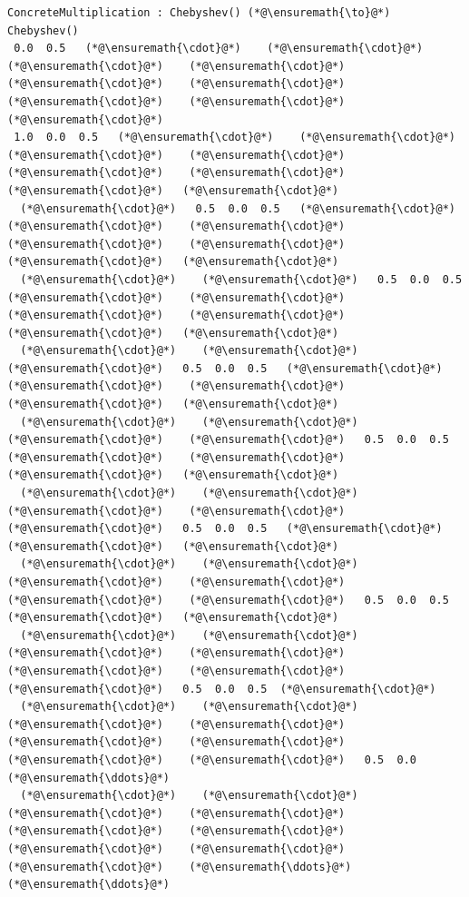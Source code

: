 \documentclass[12pt,a4paper]{article}
\begin{document}
\begin{lstlisting}
ConcreteMultiplication : Chebyshev() (*@\ensuremath{\to}@*) Chebyshev()
 0.0  0.5   (*@\ensuremath{\cdot}@*)    (*@\ensuremath{\cdot}@*)    (*@\ensuremath{\cdot}@*)    (*@\ensuremath{\cdot}@*)    (*@\ensuremath{\cdot}@*)    (*@\ensuremath{\cdot}@*)    (*@\ensuremath{\cdot}@*)    (*@\ensuremath{\cdot}@*)   (*@\ensuremath{\cdot}@*)
 1.0  0.0  0.5   (*@\ensuremath{\cdot}@*)    (*@\ensuremath{\cdot}@*)    (*@\ensuremath{\cdot}@*)    (*@\ensuremath{\cdot}@*)    (*@\ensuremath{\cdot}@*)    (*@\ensuremath{\cdot}@*)    (*@\ensuremath{\cdot}@*)   (*@\ensuremath{\cdot}@*)
  (*@\ensuremath{\cdot}@*)   0.5  0.0  0.5   (*@\ensuremath{\cdot}@*)    (*@\ensuremath{\cdot}@*)    (*@\ensuremath{\cdot}@*)    (*@\ensuremath{\cdot}@*)    (*@\ensuremath{\cdot}@*)    (*@\ensuremath{\cdot}@*)   (*@\ensuremath{\cdot}@*)
  (*@\ensuremath{\cdot}@*)    (*@\ensuremath{\cdot}@*)   0.5  0.0  0.5   (*@\ensuremath{\cdot}@*)    (*@\ensuremath{\cdot}@*)    (*@\ensuremath{\cdot}@*)    (*@\ensuremath{\cdot}@*)    (*@\ensuremath{\cdot}@*)   (*@\ensuremath{\cdot}@*)
  (*@\ensuremath{\cdot}@*)    (*@\ensuremath{\cdot}@*)    (*@\ensuremath{\cdot}@*)   0.5  0.0  0.5   (*@\ensuremath{\cdot}@*)    (*@\ensuremath{\cdot}@*)    (*@\ensuremath{\cdot}@*)    (*@\ensuremath{\cdot}@*)   (*@\ensuremath{\cdot}@*)
  (*@\ensuremath{\cdot}@*)    (*@\ensuremath{\cdot}@*)    (*@\ensuremath{\cdot}@*)    (*@\ensuremath{\cdot}@*)   0.5  0.0  0.5   (*@\ensuremath{\cdot}@*)    (*@\ensuremath{\cdot}@*)    (*@\ensuremath{\cdot}@*)   (*@\ensuremath{\cdot}@*)
  (*@\ensuremath{\cdot}@*)    (*@\ensuremath{\cdot}@*)    (*@\ensuremath{\cdot}@*)    (*@\ensuremath{\cdot}@*)    (*@\ensuremath{\cdot}@*)   0.5  0.0  0.5   (*@\ensuremath{\cdot}@*)    (*@\ensuremath{\cdot}@*)   (*@\ensuremath{\cdot}@*)
  (*@\ensuremath{\cdot}@*)    (*@\ensuremath{\cdot}@*)    (*@\ensuremath{\cdot}@*)    (*@\ensuremath{\cdot}@*)    (*@\ensuremath{\cdot}@*)    (*@\ensuremath{\cdot}@*)   0.5  0.0  0.5   (*@\ensuremath{\cdot}@*)   (*@\ensuremath{\cdot}@*)
  (*@\ensuremath{\cdot}@*)    (*@\ensuremath{\cdot}@*)    (*@\ensuremath{\cdot}@*)    (*@\ensuremath{\cdot}@*)    (*@\ensuremath{\cdot}@*)    (*@\ensuremath{\cdot}@*)    (*@\ensuremath{\cdot}@*)   0.5  0.0  0.5  (*@\ensuremath{\cdot}@*)
  (*@\ensuremath{\cdot}@*)    (*@\ensuremath{\cdot}@*)    (*@\ensuremath{\cdot}@*)    (*@\ensuremath{\cdot}@*)    (*@\ensuremath{\cdot}@*)    (*@\ensuremath{\cdot}@*)    (*@\ensuremath{\cdot}@*)    (*@\ensuremath{\cdot}@*)   0.5  0.0  (*@\ensuremath{\ddots}@*)
  (*@\ensuremath{\cdot}@*)    (*@\ensuremath{\cdot}@*)    (*@\ensuremath{\cdot}@*)    (*@\ensuremath{\cdot}@*)    (*@\ensuremath{\cdot}@*)    (*@\ensuremath{\cdot}@*)    (*@\ensuremath{\cdot}@*)    (*@\ensuremath{\cdot}@*)    (*@\ensuremath{\cdot}@*)    (*@\ensuremath{\ddots}@*)   (*@\ensuremath{\ddots}@*)
\end{lstlisting}
\end{document}
